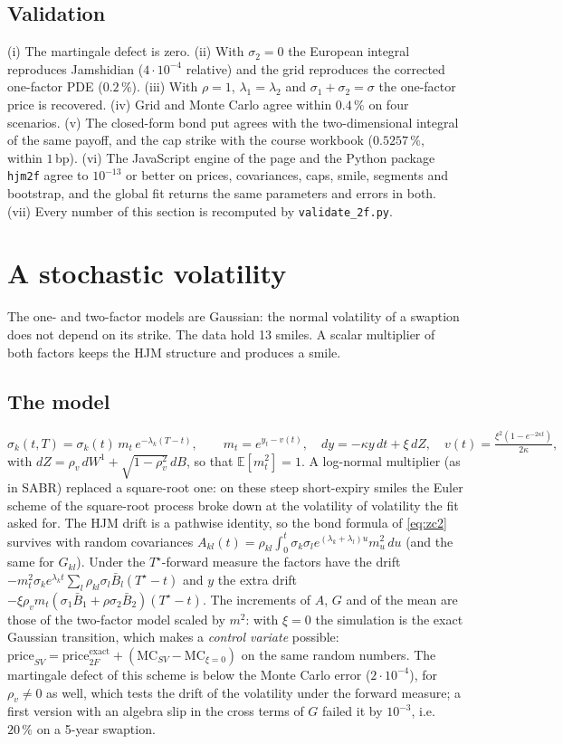 \documentclass[11pt,a4paper]{article}
\theoremstyle{definition}
\theoremstyle{remark}
\newcommand{\E}{\mathbb{E}}
\newcommand{\Bb}{\bar B}
\begin{document}
\subsection{Validation}
(i) The martingale defect is zero. (ii) With $\sigma_2=0$ the European integral reproduces Jamshidian ($4\cdot10^{-4}$ relative) and the grid reproduces the
corrected one-factor PDE ($0.2\,\%$). (iii) With $\rho=1$, $\lambda_1=\lambda_2$ and $\sigma_1+\sigma_2=\sigma$ the one-factor price is recovered.
(iv) Grid and Monte Carlo agree within $0.4\,\%$ on four scenarios. (v) The closed-form bond put agrees with the two-dimensional integral of the same payoff, and
the cap strike with the course workbook ($0.5257\,\%$, within $1\,$bp). (vi) The JavaScript engine of the page and the Python package \texttt{hjm2f} agree to $10^{-13}$ or better on
prices, covariances, caps, smile, segments and bootstrap, and the global fit returns the same parameters and errors in both. (vii) Every number of this section is recomputed
by \texttt{validate\_2f.py}.

\section{A stochastic volatility}\label{sec:sv}
The one- and two-factor models are Gaussian: the normal volatility of a swaption does not depend on its strike. The data hold 13 smiles. A scalar multiplier of both
factors keeps the HJM structure and produces a smile.

\subsection{The model}
\[
\sigma_k(t,T)=\sigma_k(t)\,m_t\,e^{-\lambda_k(T-t)},\qquad m_t=e^{y_t-v(t)},\quad dy=-\kappa y\,dt+\xi\,dZ,\quad v(t)=\tfrac{\xi^2(1-e^{-2\kappa t})}{2\kappa},
\]
with $dZ=\rho_v\,dW^1+\sqrt{1-\rho_v^2}\,dB$, so that $\E[m_t^2]=1$. A log-normal multiplier (as in SABR) replaced a square-root one: on these steep short-expiry smiles the Euler scheme of the square-root process
broke down at the volatility of volatility the fit asked for. The HJM drift is a pathwise identity, so the bond formula of \cref{eq:zc2} survives with random covariances
$A_{kl}(t)=\rho_{kl}\int_0^t\sigma_k\sigma_le^{(\lambda_k+\lambda_l)u}m_u^2\,du$ (and the same for $G_{kl}$). Under the $T^\star$-forward measure the factors have the drift
$-m_t^2\sigma_ke^{\lambda_kt}\sum_l\rho_{kl}\sigma_l\Bb_l(T^\star-t)$ and $y$ the extra drift $-\xi\rho_vm_t(\sigma_1\Bb_1+\rho\sigma_2\Bb_2)(T^\star-t)$.
The increments of $A$, $G$ and of the mean are those of the two-factor model scaled by $m^2$: with $\xi=0$ the simulation is the exact Gaussian transition, which makes a \emph{control variate}
possible: $\mathrm{price}_{SV}=\mathrm{price}_{2F}^{\mathrm{exact}}+(\mathrm{MC}_{SV}-\mathrm{MC}_{\xi=0})$ on the same random numbers. The martingale defect of this scheme is below
the Monte Carlo error ($2\cdot10^{-4}$), for $\rho_v\neq0$ as well, which tests the drift of the volatility under the forward measure; a first version with an algebra slip in the cross terms of $G$ failed it by $10^{-3}$,
i.e.\ $20\,\%$ on a 5-year swaption.
\end{document}
